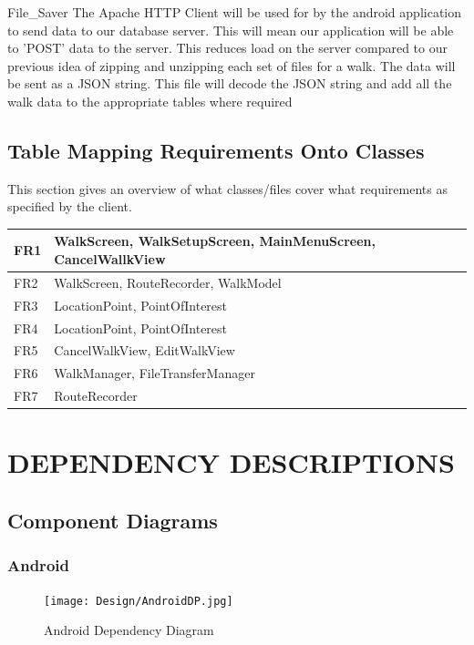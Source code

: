 \documentclass[12pt]{article}
\makeatletter
\renewcommand{\paragraph}{
  \@startsection{paragraph}{4}
  {\z@}{3.25ex \@plus -10em \@minus 1em}{0.1em}
  {\normalfont\normalsize\bfseries}
}
\makeatother
\begin{document}
\paragraph{File\_Saver}
The Apache HTTP Client will be used for by the android application to send data to our database server. This will mean our application will be able to 'POST' data to the server. This reduces load on the server compared to our previous idea of zipping and unzipping each set of files for a walk. The data will be sent as a JSON string. This file will decode the JSON string and add all the walk data to the appropriate tables where required
\subsection{Table Mapping Requirements Onto Classes}
This section gives an overview of what classes/files cover what requirements as specified by the client.

\begin{tabular}{|p{1cm}|p{10cm}|}
\hline
	FR1 & WalkScreen, WalkSetupScreen, MainMenuScreen, CancelWallkView\\
\hline
	FR2 & WalkScreen, RouteRecorder, WalkModel\\
\hline
	FR3 & LocationPoint, PointOfInterest\\
\hline
	FR4 & LocationPoint, PointOfInterest\\
\hline
	FR5 & CancelWalkView, EditWalkView\\
\hline
	FR6 & WalkManager, FileTransferManager
\\
\hline
	FR7 & RouteRecorder\\
\hline
\end{tabular}
\newpage
\section{DEPENDENCY DESCRIPTIONS}
\subsection{Component Diagrams}
\subsubsection{Android}
\begin{figure}[htp]
\centering
\texttt{[image: Design/AndroidDP.jpg]}
\caption{Android Dependency Diagram}
\label{Android Dependency Diagram}
\end{figure}
\end{document}
